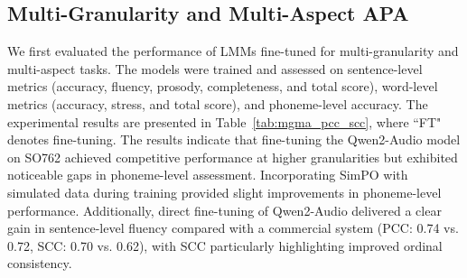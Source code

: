 \documentclass{article}
\begin{document}
\subsection{Multi-Granularity and Multi-Aspect APA}
\label{ssec:mgma}

\begin{table}[th]
  \caption{PCC and SCC results for multi-granularity and multi-aspect APA on the SO762 dataset.}
  \label{tab:mgma_pcc_scc}
  \centering
\end{table}

We first evaluated the performance of LMMs fine-tuned for multi-granularity and multi-aspect tasks. The models were trained and assessed on sentence-level metrics (accuracy, fluency, prosody, completeness, and total score), word-level metrics (accuracy, stress, and total score), and phoneme-level accuracy. The experimental results are presented in Table~\ref{tab:mgma_pcc_scc}, where ``FT" denotes fine-tuning. The results indicate that fine-tuning the Qwen2-Audio model on SO762 achieved competitive performance at higher granularities but exhibited noticeable gaps in phoneme-level assessment. Incorporating SimPO with simulated data during training provided slight improvements in phoneme-level performance. Additionally, direct fine-tuning of Qwen2-Audio delivered a clear gain in sentence-level fluency compared with a commercial system (PCC: 0.74 vs. 0.72, SCC: 0.70 vs. 0.62), with SCC particularly highlighting improved ordinal consistency.
\end{document}
